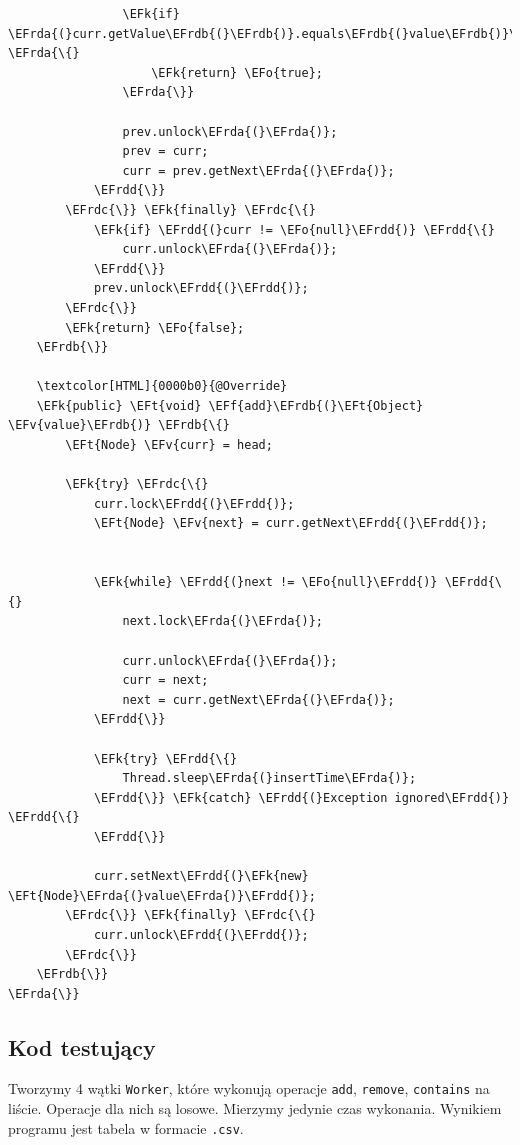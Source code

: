\documentclass[11pt]{article}
\newcommand{\EFk}[1]{\textcolor{EFk}{#1}} %
\newcommand{\EFf}[1]{\textcolor{EFf}{#1}} %
\newcommand{\EFv}[1]{\textcolor{EFv}{#1}} %
\newcommand{\EFt}[1]{\textcolor{EFt}{#1}} %
\newcommand{\EFo}[1]{\textcolor{EFo}{#1}} %
\newcommand{\EFrda}[1]{#1} %
\newcommand{\EFrdb}[1]{\textcolor{EFrdb}{#1}} %
\newcommand{\EFrdc}[1]{\textcolor{EFrdc}{#1}} %
\newcommand{\EFrdd}[1]{\textcolor{EFrdd}{#1}} %
\begin{document}
\begin{Code}
\begin{Verbatim}
                \EFk{if} \EFrda{(}curr.getValue\EFrdb{(}\EFrdb{)}.equals\EFrdb{(}value\EFrdb{)}\EFrda{)} \EFrda{\{}
                    \EFk{return} \EFo{true};
                \EFrda{\}}

                prev.unlock\EFrda{(}\EFrda{)};
                prev = curr;
                curr = prev.getNext\EFrda{(}\EFrda{)};
            \EFrdd{\}}
        \EFrdc{\}} \EFk{finally} \EFrdc{\{}
            \EFk{if} \EFrdd{(}curr != \EFo{null}\EFrdd{)} \EFrdd{\{}
                curr.unlock\EFrda{(}\EFrda{)};
            \EFrdd{\}}
            prev.unlock\EFrdd{(}\EFrdd{)};
        \EFrdc{\}}
        \EFk{return} \EFo{false};
    \EFrdb{\}}

    \textcolor[HTML]{0000b0}{@Override}
    \EFk{public} \EFt{void} \EFf{add}\EFrdb{(}\EFt{Object} \EFv{value}\EFrdb{)} \EFrdb{\{}
        \EFt{Node} \EFv{curr} = head;

        \EFk{try} \EFrdc{\{}
            curr.lock\EFrdd{(}\EFrdd{)};
            \EFt{Node} \EFv{next} = curr.getNext\EFrdd{(}\EFrdd{)};


            \EFk{while} \EFrdd{(}next != \EFo{null}\EFrdd{)} \EFrdd{\{}
                next.lock\EFrda{(}\EFrda{)};

                curr.unlock\EFrda{(}\EFrda{)};
                curr = next;
                next = curr.getNext\EFrda{(}\EFrda{)};
            \EFrdd{\}}

            \EFk{try} \EFrdd{\{}
                Thread.sleep\EFrda{(}insertTime\EFrda{)};
            \EFrdd{\}} \EFk{catch} \EFrdd{(}Exception ignored\EFrdd{)} \EFrdd{\{}
            \EFrdd{\}}

            curr.setNext\EFrdd{(}\EFk{new} \EFt{Node}\EFrda{(}value\EFrda{)}\EFrdd{)};
        \EFrdc{\}} \EFk{finally} \EFrdc{\{}
            curr.unlock\EFrdd{(}\EFrdd{)};
        \EFrdc{\}}
    \EFrdb{\}}
\EFrda{\}}
\end{Verbatim}
\end{Code}
\subsection*{Kod testujący}
\label{sec:org361352c}
Tworzymy 4 wątki \texttt{Worker}, które wykonują operacje \texttt{add}, \texttt{remove}, \texttt{contains} na liście.
Operacje dla nich są losowe. Mierzymy jedynie czas wykonania. Wynikiem
programu jest tabela w formacie \texttt{.csv}.
\end{document}
